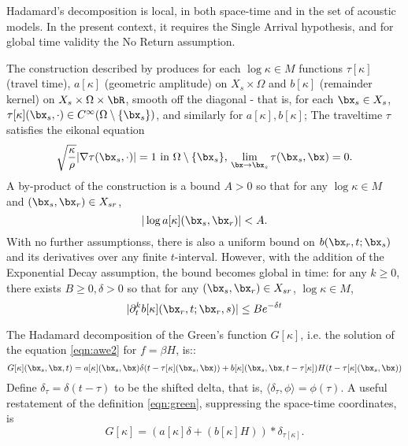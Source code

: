 Hadamard's decomposition is local, in both space-time and in the set of
acoustic models. In the present context, it requires the Single
Arrival hypothesis, and for global time validity the No Return
assumption. 

The construction described by \cite{Friedlander:75} produces for each $\log \kappa \in M$ functions $\tau[\kappa]$ (travel time), $a[\kappa]$
(geometric amplitude) on $X_s \times \Omega$ and $b[\kappa]$
(remainder kernel) on $X_s \times \Omega \times \bR$, smooth off the
diagonal - that is, for each $\bx_s \in X_s$, $\tau[\kappa](\bx_s,\cdot) \in C^{\infty}(\Omega \setminus
  \{\bx_s\})$, and similarly for $a[\kappa],b[\kappa]$; The traveltime $\tau$
  satisfies the eikonal equation
  \[
    \sqrt{\frac{\kappa}{\rho}} |\nabla \tau(\bx_s,\cdot)| = 1 \mbox{ in } \Omega \setminus
    \{\bx_s\}, \, \lim_{\bx \rightarrow \bx_s} \tau(\bx_s,\bx) = 0.
  \]
A by-product of the construction is a bound $A>0$ so that for any $\log \kappa \in M$
and $(\bx_s,\bx_r) \in X_{sr}$,
\begin{equation}
  \label{eqn:aest}
  |\log a[\kappa](\bx_s,\bx_r)| <  A.
\end{equation}
With no further assumptionss, there is also a uniform bound on
$b(\bx_r,t;\bx_s)$ and
its derivatives over any finite $t$-interval. However, with the
addition of the Exponential Decay assumption, the bound becomes
global in time: for any $k \ge 0$, there exists $B \ge 0,\delta > 0$
so that for any $(\bx_s,\bx_r) \in X_{sr}$, $\log \kappa \in M$,
\begin{equation}
  |\partial^k_t b[\kappa](\bx_r,t;\bx_r,s)| \le B e^{-\delta t}
  \label{eqn:best}
\end{equation}

The Hadamard
decomposition of the Green's function $G[\kappa]$, i.e. the solution of the
equation \ref{eqn:awe2} for $f = \beta H$, is::
\begin{equation}
  \label{eqn:green}
  G[\kappa](\bx_s,\bx,t) = a[\kappa](\bx_s,\bx)\delta(t - \tau[\kappa](\bx_s,\bx)) +
  b[\kappa](\bx_s,\bx,t-\tau[\kappa])H(t - \tau[\kappa](\bx_s,\bx))
\end{equation}
Define $\delta_{\tau} = \delta(t-\tau)$ to be the shifted delta, that
is, $\langle \delta_{\tau},\phi\rangle = \phi(\tau)$. A useful
restatement of the definition \ref{eqn:green}, suppressing the
space-time coordinates, is
\begin{equation}
  \label{eqn:regreen}
  G[\kappa] = (a[\kappa]\delta +  (b[\kappa]H))*\delta_{\tau[\kappa]}.
\end{equation}


